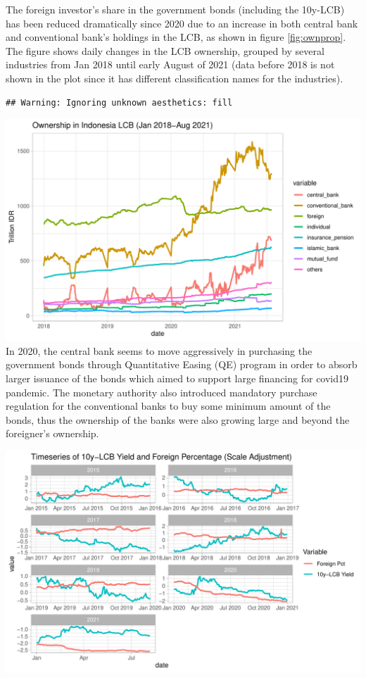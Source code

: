 \documentclass[11pt,a4paper,]{article}
\begin{document}
The foreign investor's share in the government bonds (including the 10y-LCB) has been reduced dramatically since 2020 due to an increase in both central bank and conventional bank's holdings in the LCB, as shown in figure \ref{fig:ownprop}. The figure shows daily changes in the LCB ownership, grouped by several industries from Jan 2018 until early August of 2021 (data before 2018 is not shown in the plot since it has different classification names for the industries).

\begin{verbatim}
## Warning: Ignoring unknown aesthetics: fill
\end{verbatim}

\includegraphics{Untitled_files/figure-latex/ownprop-1.pdf}
In 2020, the central bank seems to move aggressively in purchasing the government bonds through Quantitative Easing (QE) program in order to absorb larger issuance of the bonds which aimed to support large financing for covid19 pandemic. The monetary authority also introduced mandatory purchase regulation for the conventional banks to buy some minimum amount of the bonds, thus the ownership of the banks were also growing large and beyond the foreigner's ownership.

\includegraphics{Untitled_files/figure-latex/unnamed-chunk-12-1.pdf}
\end{document}
